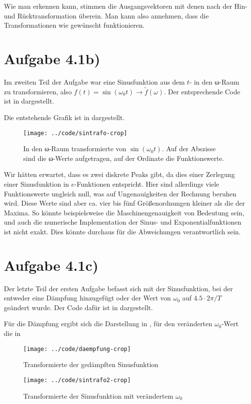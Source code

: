 Wie man erkennen kann, stimmen die Ausgangsvektoren mit denen nach der Hin- und
Rücktransformation überein. Man kann also annehmen, dass die Transformationen wie
gewünscht funktionieren.

\section*{Aufgabe 4.1b)}
Im zweiten Teil der Aufgabe war eine Sinusfunktion aus dem $t$- in den ω-Raum zu
transformieren, also $f(t) = \sin(ω_0t) → \tilde{f}(ω)$. Der entsprechende Code
ist in  dargestellt.



Die entstehende Grafik ist in  dargestellt.

\begin{figure}[htb]
\centering
  \texttt{[image: ../code/sintrafo-crop]}
  \caption{In den ω-Raum transformierte von $\sin(ω_0t)$. Auf der Abszisse sind
  die ω-Werte aufgetragen, auf der Ordinate die Funktionswerte.}
  \label{fig:sintrafo}
\end{figure}

Wir hätten erwartet, dass es zwei diskrete Peaks gibt, da dies einer Zerlegung 
einer Sinusfunktion in $e$-Funktionen entspricht. Hier sind allerdings viele 
Funktionswerte ungleich null, was auf Ungenauigkeiten der Rechnung beruhen wird. 
Diese Werte sind aber ca. vier bis fünf Größenordnungen kleiner als die der Maxima.
So könnte beispielsweise die Maschinengenauigkeit von Bedeutung sein, und auch die
numerische Implementation der Sinus- und Exponentialfunktionen ist nicht exakt. 
Dies könnte durchaus für die Abweichungen verantwortlich sein.

\section*{Aufgabe 4.1c)}
Der letzte Teil der ersten Aufgabe befasst sich mit der Sinusfunktion, bei der 
entweder eine Dämpfung hinzugefügt oder der Wert von $ω_0$ auf $4.5\cdot 2π/T$
geändert wurde. Der Code dafür ist in  dargestellt.



Für die Dämpfung ergibt sich die Darstellung in , für den
veränderten $ω_0$-Wert die in 

\begin{figure}[htb]
\centering
  \texttt{[image: ../code/daempfung-crop]}
  \caption{Transformierte der gedämpften Sinusfunktion}
  \label{fig:daempfung}
\end{figure}

\begin{figure}[htb]
\centering
  \texttt{[image: ../code/sintrafo2-crop]}
  \caption{Transformierte der Sinusfunktion mit verändertem $ω_0$}
  \label{fig:w0}
\end{figure}